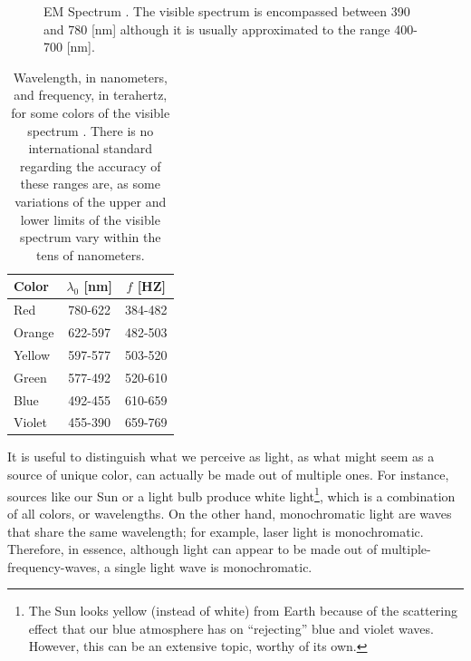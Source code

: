 \begin{figure}[htbp]
    \centering
    \caption{EM Spectrum \protect\cite{EM_Spectrum-Figure}. The visible spectrum is encompassed between 390 and 780 [nm] although it is usually approximated to the range 400-700 [nm].}
    \label{fig:EM_Spectrum}
\end{figure}

\begin{table}[htbp]
    \centering
    \begin{tabular}{|l|c|c|}
    \hline
    \textbf{Color} & \textbf{$\lambda_0$ [nm]} & \textbf{$f$ [HZ]} \\ \hline
    Red           & 780-622                       & 384-482                  \\ \hline
    Orange        & 622-597                       & 482-503                  \\ \hline
    Yellow       & 597-577                       & 503-520                  \\ \hline
    Green          & 577-492                       & 520-610                  \\ \hline
    Blue           & 492-455                       & 610-659                  \\ \hline
    Violet        & 455-390                       & 659-769                  \\ \hline
    \end{tabular}
    \caption{Wavelength, in nanometers, and frequency, in terahertz, for some colors of the visible spectrum \protect\cite{Hecht_Optics-Visible_Light}. There is no international standard regarding the accuracy of these ranges are, as some variations of the upper and lower limits of the visible spectrum vary within the tens of nanometers.}
    \label{tab:VisibleLight}
\end{table}

\newpage
It is useful to distinguish what we perceive as light, as what might seem as a source of unique color, can actually be made out of multiple ones. For instance, sources like our Sun or a light bulb produce white light\footnote{The Sun looks yellow (instead of white) from Earth because of the scattering effect that our blue atmosphere has on ``rejecting'' blue and violet waves. However, this can be an extensive topic, worthy of its own.}, which is a combination of all colors, or wavelengths. On the other hand, monochromatic light are waves that share the same wavelength; for example, laser light is monochromatic. Therefore, in essence, although light can appear to be made out of multiple-frequency-waves, a single light wave is monochromatic.

